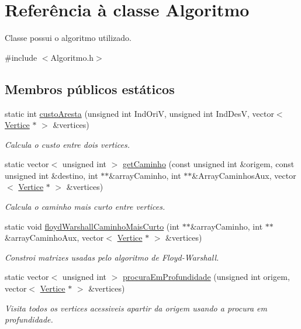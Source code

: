 \hypertarget{class_algoritmo}{\section{Referência à classe Algoritmo}
\label{class_algoritmo}
}


Classe possui o algoritmo utilizado.  




{\ttfamily \#include $<$Algoritmo.\-h$>$}

\subsection*{Membros públicos estáticos}
\begin{DoxyCompactItemize}
\item 
static int \hyperlink{class_algoritmo_ad15a3a5845441a80b46970319edad089}{custo\-Aresta} (unsigned int Ind\-Ori\-V, unsigned int Ind\-Des\-V, vector$<$ \hyperlink{class_vertice}{Vertice} $\ast$ $>$ \&vertices)
\begin{DoxyCompactList}\small\item\em Calcula o custo entre dois vertices. \end{DoxyCompactList}\item 
static vector$<$ unsigned int $>$ \hyperlink{class_algoritmo_a18eba39cbde146bcda1e86a562cc8935}{get\-Caminho} (const unsigned int \&origem, const unsigned int \&destino, int $\ast$$\ast$\&array\-Caminho, int $\ast$$\ast$\&Array\-Caminhos\-Aux, vector$<$ \hyperlink{class_vertice}{Vertice} $\ast$ $>$ \&vertices)
\begin{DoxyCompactList}\small\item\em Calcula o caminho mais curto entre vertices. \end{DoxyCompactList}\item 
static void \hyperlink{class_algoritmo_a3f0db20d251dda5f96b2e33a6fee00f8}{floyd\-Warshall\-Caminho\-Mais\-Curto} (int $\ast$$\ast$\&array\-Caminho, int $\ast$$\ast$\&array\-Caminho\-Aux, vector$<$ \hyperlink{class_vertice}{Vertice} $\ast$ $>$ \&vertices)
\begin{DoxyCompactList}\small\item\em Constroi matrizes usadas pelo algoritmo de Floyd-\/\-Warshall. \end{DoxyCompactList}\item 
static vector$<$ unsigned int $>$ \hyperlink{class_algoritmo_a39bc793c9a0d71b78f2b3d4b31f522ae}{procura\-Em\-Profundidade} (unsigned int origem, vector$<$ \hyperlink{class_vertice}{Vertice} $\ast$ $>$ \&vertices)
\begin{DoxyCompactList}\small\item\em Visita todos os vertices acessiveis apartir da origem usando a procura em profundidade. \end{DoxyCompactList}\end{DoxyCompactItemize}


